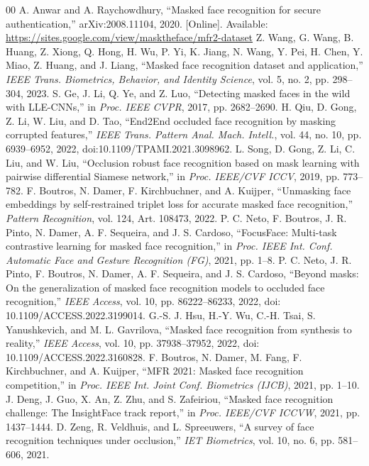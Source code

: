﻿\documentclass[10pt,journal,compsoc]{IEEEtran}
\begin{document}
\begin{thebibliography}{00}
 A. Anwar and A. Raychowdhury, ``Masked face recognition for secure authentication,'' arXiv:2008.11104, 2020. [Online]. Available: \url{https://sites.google.com/view/masktheface/mfr2-dataset}
 Z. Wang, G. Wang, B. Huang, Z. Xiong, Q. Hong, H. Wu, P. Yi, K. Jiang, N. Wang, Y. Pei, H. Chen, Y. Miao, Z. Huang, and J. Liang, ``Masked face recognition dataset and application,'' \textit{IEEE Trans. Biometrics, Behavior, and Identity Science}, vol. 5, no. 2, pp. 298--304, 2023.
 S. Ge, J. Li, Q. Ye, and Z. Luo, ``Detecting masked faces in the wild with LLE-CNNs,'' in \textit{Proc. IEEE CVPR}, 2017, pp. 2682--2690.
 H. Qiu, D. Gong, Z. Li, W. Liu, and D. Tao, ``End2End occluded face recognition by masking corrupted features,'' \textit{IEEE Trans. Pattern Anal. Mach. Intell.}, vol. 44, no. 10, pp. 6939--6952, 2022, doi:10.1109/TPAMI.2021.3098962.
 L. Song, D. Gong, Z. Li, C. Liu, and W. Liu, ``Occlusion robust face recognition based on mask learning with pairwise differential Siamese network,'' in \textit{Proc. IEEE/CVF ICCV}, 2019, pp. 773--782.
 F. Boutros, N. Damer, F. Kirchbuchner, and A. Kuijper, ``Unmasking face embeddings by self-restrained triplet loss for accurate masked face recognition,'' \textit{Pattern Recognition}, vol. 124, Art. 108473, 2022.
 P. C. Neto, F. Boutros, J. R. Pinto, N. Damer, A. F. Sequeira, and J. S. Cardoso, ``FocusFace: Multi-task contrastive learning for masked face recognition,'' in \textit{Proc. IEEE Int. Conf. Automatic Face and Gesture Recognition (FG)}, 2021, pp. 1--8.
 P. C. Neto, J. R. Pinto, F. Boutros, N. Damer, A. F. Sequeira, and J. S. Cardoso, ``Beyond masks: On the generalization of masked face recognition models to occluded face recognition,'' \textit{IEEE Access}, vol. 10, pp. 86222--86233, 2022, doi: 10.1109/ACCESS.2022.3199014.
 G.-S. J. Hsu, H.-Y. Wu, C.-H. Tsai, S. Yanushkevich, and M. L. Gavrilova, ``Masked face recognition from synthesis to reality,'' \textit{IEEE Access}, vol. 10, pp. 37938--37952, 2022, doi: 10.1109/ACCESS.2022.3160828.
 F. Boutros, N. Damer, M. Fang, F. Kirchbuchner, and A. Kuijper, ``MFR 2021: Masked face recognition competition,'' in \textit{Proc. IEEE Int. Joint Conf. Biometrics (IJCB)}, 2021, pp. 1--10.
 J. Deng, J. Guo, X. An, Z. Zhu, and S. Zafeiriou, ``Masked face recognition challenge: The InsightFace track report,'' in \textit{Proc. IEEE/CVF ICCVW}, 2021, pp. 1437--1444.
 D. Zeng, R. Veldhuis, and L. Spreeuwers, ``A survey of face recognition techniques under occlusion,'' \textit{IET Biometrics}, vol. 10, no. 6, pp. 581--606, 2021.

\end{thebibliography}
\end{document}

